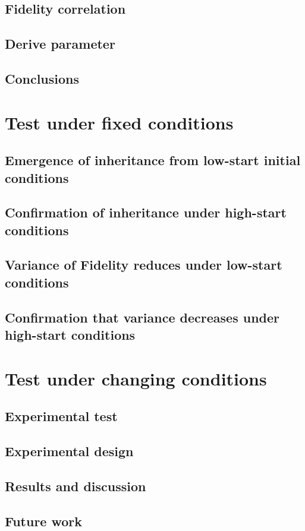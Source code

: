 \documentclass[]{report}
\begin{document}
\section{Fidelity correlation}
\section{Derive parameter}
\section{Conclusions}

\chapter{Test under fixed conditions}
\section{Emergence of inheritance from low-start initial conditions}
\section{Confirmation of inheritance under high-start conditions}
\section{Variance of Fidelity reduces under low-start conditions}
\section{Confirmation that variance decreases under high-start conditions}

\chapter{Test under changing conditions}
\section{Experimental test}
\section{Experimental design}
\section{Results and discussion}
\section{Future work}
\end{document}
